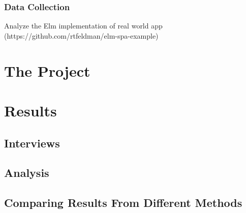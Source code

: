 \documentclass[a4paper,english]{ifimaster}
\begin{document}
\subsection{Data Collection}
Analyze the Elm implementation of real world app (https://github.com/rtfeldman/elm-spa-example)

\chapter{The Project}\label{the_project}

\chapter{Results}\label{results}
\section{Interviews}
\section{Analysis}
\section{Comparing Results From Different Methods}


\backmatter{}
\printbibliography{}
\end{document}

